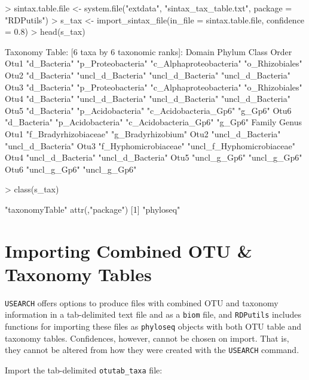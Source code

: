 \documentclass{article}
\begin{document}
\begin{Schunk}
\begin{Sinput}
> sintax.table.file <- system.file("extdata", "sintax_tax_table.txt", package = "RDPutils")
> s_tax <- import_sintax_file(in_file = sintax.table.file, confidence = 0.8)
> head(s_tax)
\end{Sinput}
\begin{Soutput}
Taxonomy Table:     [6 taxa by 6 taxonomic ranks]:
     Domain       Phylum             Class                   Order            
Otu1 "d_Bacteria" "p_Proteobacteria" "c_Alphaproteobacteria" "o_Rhizobiales"  
Otu2 "d_Bacteria" "uncl_d_Bacteria"  "uncl_d_Bacteria"       "uncl_d_Bacteria"
Otu3 "d_Bacteria" "p_Proteobacteria" "c_Alphaproteobacteria" "o_Rhizobiales"  
Otu4 "d_Bacteria" "uncl_d_Bacteria"  "uncl_d_Bacteria"       "uncl_d_Bacteria"
Otu5 "d_Bacteria" "p_Acidobacteria"  "c_Acidobacteria_Gp6"   "g_Gp6"          
Otu6 "d_Bacteria" "p_Acidobacteria"  "c_Acidobacteria_Gp6"   "g_Gp6"          
     Family                Genus                     
Otu1 "f_Bradyrhizobiaceae" "g_Bradyrhizobium"        
Otu2 "uncl_d_Bacteria"     "uncl_d_Bacteria"         
Otu3 "f_Hyphomicrobiaceae" "uncl_f_Hyphomicrobiaceae"
Otu4 "uncl_d_Bacteria"     "uncl_d_Bacteria"         
Otu5 "uncl_g_Gp6"          "uncl_g_Gp6"              
Otu6 "uncl_g_Gp6"          "uncl_g_Gp6"              
\end{Soutput}
\begin{Sinput}
> class(s_tax)
\end{Sinput}
\begin{Soutput}
[1] "taxonomyTable"
attr(,"package")
[1] "phyloseq"
\end{Soutput}
\end{Schunk}

\section*{Importing Combined OTU \& Taxonomy Tables}

\texttt{USEARCH} offers options to produce files with combined OTU and taxonomy information in a tab-delimited text file and as a \texttt{biom} file, and \texttt{RDPutils} includes functions for importing these files as \texttt{phyloseq} objects with both OTU table and taxonomy tables. Confidences, however, cannot be chosen on import. That is, they cannot be altered from how they were created with the \texttt{USEARCH} command.  

Import the tab-delimited \texttt{otutab\_taxa} file:  
\end{document}
